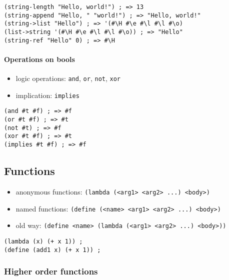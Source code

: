 \documentclass[a4paper,landscape,10pt]{article}
\begin{document}
\begin{multicols*}{2}
  \begin{lstlisting}[language=Racket]
(string-length "Hello, world!") ; => 13
(string-append "Hello, " "world!") ; => "Hello, world!"
(string->list "Hello") ; => '(#\H #\e #\l #\l #\o)
(list->string '(#\H #\e #\l #\l #\o)) ; => "Hello"
(string-ref "Hello" 0) ; => #\H
\end{lstlisting}

  \switchcolumn

  \paragraph{Operations on bools}

  \begin{itemize}
    \item logic operations: \lstinline[language=Racket]!and!, \lstinline[language=Racket]!or!, \lstinline[language=Racket]!not!, \lstinline[language=Racket]!xor!
    \item implication: \lstinline[language=Racket]!implies!
  \end{itemize}

  \begin{lstlisting}[language=Racket]
(and #t #f) ; => #f
(or #t #f) ; => #t
(not #t) ; => #f
(xor #t #f) ; => #t
(implies #t #f) ; => #f
\end{lstlisting}

  \subsection{Functions}

  \begin{itemize}
    \item anonymous functions: \lstinline[language=Racket]!(lambda (<arg1> <arg2> ...) <body>)!
    \item named functions: \lstinline[language=Racket]!(define (<name> <arg1> <arg2> ...) <body>)!
    \item old way: \lstinline[language=Racket]!(define <name> (lambda (<arg1> <arg2> ...) <body>))!
  \end{itemize}

  \begin{lstlisting}[language=Racket]
(lambda (x) (+ x 1)) ;
(define (add1 x) (+ x 1)) ;
\end{lstlisting}

  \subsubsection{Higher order functions}


\end{multicols*}
\end{document}
